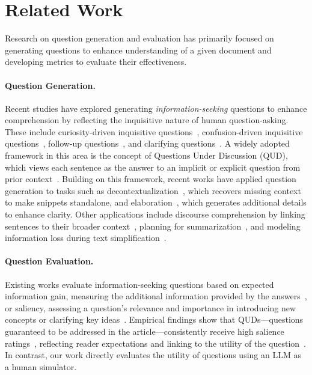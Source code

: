 \section{Related Work}
Research on question generation and evaluation has primarily focused on generating questions to enhance understanding of a given document and developing metrics to evaluate their effectiveness.

\paragraph{Question Generation.}
Recent studies have explored generating \textit{information-seeking }questions to enhance comprehension by reflecting the inquisitive nature of human question-asking.
These include curiosity-driven inquisitive questions~\cite{ko-etal-2020-inquisitive, wu2024questions}, confusion-driven inquisitive questions~\cite{chang2024booookscore}, follow-up questions~\cite{meng-etal-2023-followupqg}, and clarifying questions~\cite{chen2018learningq, rao-daume-iii-2018-learning, rao-daume-iii-2019-answer, kumar-black-2020-clarq, majumder-etal-2021-ask}.
A widely adopted framework in this area is the concept of Questions Under Discussion (QUD), which views each sentence as the answer to an implicit or explicit question from prior context~\cite{van1995discourse, roberts2012information, onea2016potential, benz2017questions}.
Building on this framework, recent works have applied question generation to tasks such as decontextualization~\cite{newman-etal-2023-question}, which recovers missing context to make snippets standalone, and elaboration~\cite{wu-etal-2023-elaborative}, which generates additional details to enhance clarity. 
Other applications include discourse comprehension by linking sentences to their broader context~\cite{ko-etal-2022-discourse}, 
planning for summarization~\cite{narayan2023conditional}, 
and modeling information loss during text simplification~\cite{trienes-etal-2024-infolossqa}.

\paragraph{Question Evaluation.}
Existing works evaluate information-seeking questions based on expected information gain, measuring the additional information provided by the answers~\cite{lindley1956measure, schaeffer2003science, rao-daume-iii-2018-learning, yu-etal-2020-interactive, white-etal-2021-open, keh-etal-2024-asking}, or saliency, assessing a question's relevance and importance in introducing new concepts or clarifying key ideas~\cite{wu2024questions}.
Empirical findings show that QUDs—questions guaranteed to be addressed in the article—consistently receive high salience ratings~\cite{ko-etal-2022-discourse}, reflecting reader expectations and linking to the utility of the question~\cite{van2003questioning, wu2024questions}.
In contrast, our work directly evaluates the utility of questions using an LLM as a human simulator.

